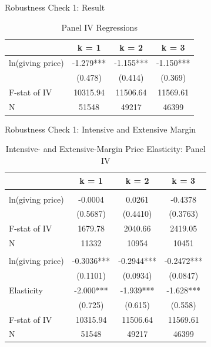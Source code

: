 \documentclass[
  ignorenonframetext,
]{beamer}
\begin{document}
\begin{frame}{Robustness Check 1: Result}
\protect\hypertarget{robustness-check-1-result}{}
\begin{table}

\caption{\label{tab:kablePanelIVEstimateElasticity}Panel IV Regressions}
\centering
\begin{tabular}[t]{lccc}
\toprule
 & k = 1 & k = 2 & k = 3\\
\midrule
ln(giving price) & -1.279*** & -1.155*** & -1.150***\\
 & (0.478) & (0.414) & (0.369)\\
F-stat of IV & 10315.94 & 11506.64 & 11569.61\\
N & 51548 & 49217 & 46399\\
\bottomrule
\end{tabular}
\end{table}
\end{frame}

\begin{frame}{Robustness Check 1: Intensive and Extensive Margin}
\protect\hypertarget{robustness-check-1-intensive-and-extensive-margin}{}
\begin{table}

\caption{\label{tab:kablePanelIVEstimateElasticityIntExt}Intensive- and Extensive-Margin Price Elasticity: Panel IV}
\centering
\fontsize{9}{11}\selectfont
\begin{tabular}[t]{lccc}
\toprule
 & k = 1 & k = 2 & k = 3\\
\midrule
\addlinespace[0.3em]
\multicolumn{4}{l}{\textbf{Intensive Margin}}\\
\hspace{1em}ln(giving price) & -0.0004 & 0.0261 & -0.4378\\
\hspace{1em} & (0.5687) & (0.4410) & (0.3763)\\
\hspace{1em}F-stat of IV & 1679.78 & 2040.66 & 2419.05\\
\hspace{1em}N & 11332 & 10954 & 10451\\
\addlinespace[0.3em]
\multicolumn{4}{l}{\textbf{Extensive Margin}}\\
\hspace{1em}ln(giving price) & -0.3036*** & -0.2944*** & -0.2472***\\
\hspace{1em} & (0.1101) & (0.0934) & (0.0847)\\
\hspace{1em}Elasticity & -2.000*** & -1.939*** & -1.628***\\
\hspace{1em} & (0.725) & (0.615) & (0.558)\\
\hspace{1em}F-stat of IV & 10315.94 & 11506.64 & 11569.61\\
\hspace{1em}N & 51548 & 49217 & 46399\\
\bottomrule
\end{tabular}
\end{table}
\end{frame}
\end{document}
